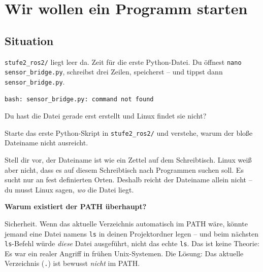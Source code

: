 \chapter{Wir wollen ein Programm starten}

\kapitelstruktur

\section{Situation}

\texttt{stufe2\_ros2/} liegt leer da. Zeit für die erste Python-Datei.
Du öffnest \texttt{nano sensor\_bridge.py}, schreibst drei Zeilen,
speicherst -- und tippst dann \texttt{sensor\_bridge.py}.

\begin{lstlisting}[style=text]
bash: sensor_bridge.py: command not found
\end{lstlisting}

Du hast die Datei gerade erst erstellt und Linux findet sie nicht?

\begin{aufgabeBox}
Starte das erste Python-Skript in \texttt{stufe2\_ros2/}
und verstehe, warum der bloße Dateiname nicht ausreicht.
\end{aufgabeBox}

\begin{problemBox}
Stell dir vor, der Dateiname ist wie ein Zettel auf dem Schreibtisch.
Linux weiß aber nicht, dass es auf diesem Schreibtisch nach
Programmen suchen soll. Es sucht nur an fest definierten Orten.
Deshalb reicht der Dateiname allein nicht -- du musst Linux
sagen, \emph{wo} die Datei liegt.
\end{problemBox}

\begin{haubeBox}
\textbf{Warum existiert der PATH überhaupt?}

Sicherheit. Wenn das aktuelle Verzeichnis automatisch im PATH wäre,
könnte jemand eine Datei namens \texttt{ls} in deinen Projektordner
legen -- und beim nächsten \texttt{ls}-Befehl würde \emph{diese}
Datei ausgeführt, nicht das echte \texttt{ls}.
Das ist keine Theorie: Es war ein realer Angriff in frühen
Unix-Systemen. Die Lösung: Das aktuelle Verzeichnis (\texttt{.})
ist bewusst \emph{nicht} im PATH.
\end{haubeBox}

